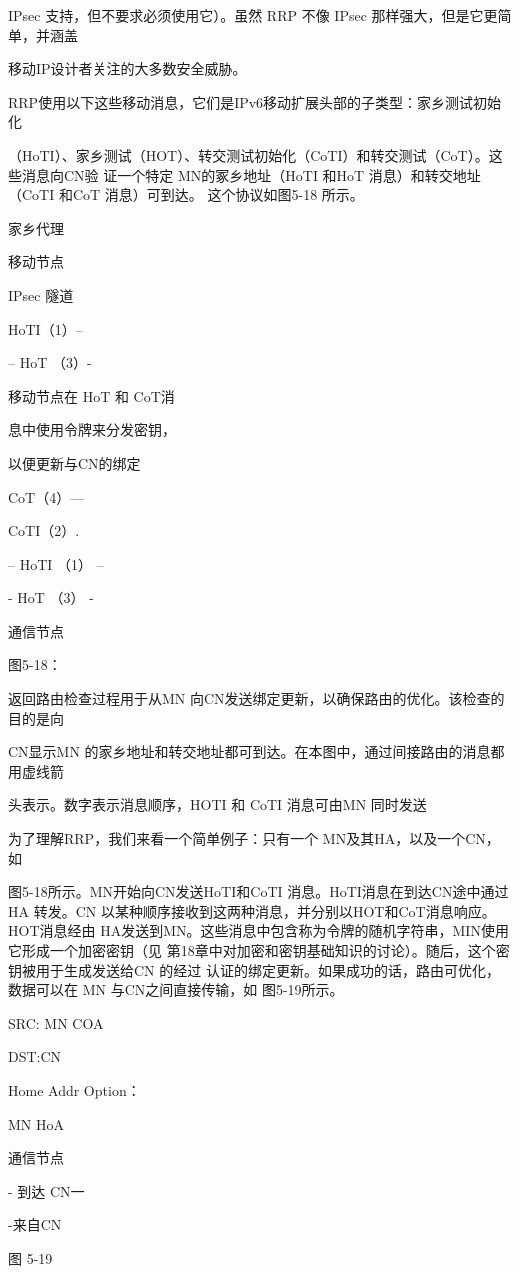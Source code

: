 IPsec 支持，但不要求必须使用它）。虽然 RRP 不像 IPsec 那样强大，但是它更简单，并涵盖

移动IP设计者关注的大多数安全威胁。

RRP使用以下这些移动消息，它们是IPv6移动扩展头部的子类型：家乡测试初始化

（HoTI）、家乡测试（HOT）、转交测试初始化（CoTI）和转交测试（CoT）。这些消息向CN验
证一个特定 MN的冢乡地址（HoTI 和HoT 消息）和转交地址（CoTI 和CoT 消息）可到达。
这个协议如图5-18 所示。

家乡代理

移动节点

IPsec 隧道

HoTI（1）--

-- HoT （3）-

移动节点在 HoT 和 CoT消

息中使用令牌来分发密钥，

以便更新与CN的绑定

CoT（4）—

CoTI（2）.

-- HoTI （1） --

- HoT （3） -

通信节点

图5-18：

返回路由检查过程用于从MN 向CN发送绑定更新，以确保路由的优化。该检查的目的是向

CN显示MN 的家乡地址和转交地址都可到达。在本图中，通过间接路由的消息都用虚线箭

头表示。数字表示消息顺序，HOTI 和 CoTI 消息可由MN 同时发送

为了理解RRP，我们来看一个简单例子：只有一个 MN及其HA，以及一个CN，如

图5-18所示。MN开始向CN发送HoTI和CoTI 消息。HoTI消息在到达CN途中通过HA
转发。CN 以某种顺序接收到这两种消息，并分别以HOT和CoT消息响应。HOT消息经由
HA发送到MN。这些消息中包含称为令牌的随机字符串，MIN使用它形成一个加密密钥（见
第18章中对加密和密钥基础知识的讨论）。随后，这个密钥被用于生成发送给CN 的经过
认证的绑定更新。如果成功的话，路由可优化，数据可以在 MN 与CN之间直接传输，如
图5-19所示。

SRC: MN COA

DST:CN

Home Addr Option：

MN HoA

通信节点

- 到达 CN一

-来自CN

图 5-19


